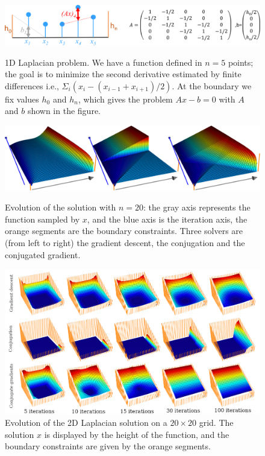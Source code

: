 \documentclass[notitlepage,oneside]{book}
\begin{document}
\begin{figure}[p]
  \centering
  \includegraphics[width=1\linewidth]{img/cg/laplace1d.png}
  \caption{1D Laplacian problem. We have a function defined in $n=5$ points; the goal is to minimize the second derivative estimated by finite differences i.e., $\Sigma_i( x_i-(x_{i-1}+x_{i+1})/2)$. 
    At the boundary we fix values $h_0$ and $h_n$, which gives the problem $Ax-b=0$ with $A$ and $b$ shown in the figure. }
  \label{fig:laplace1d}
  \vspace{5mm}

  \includegraphics[width=1\linewidth]{img/cg/laplace1dresults.png}
  \caption{
    Evolution of the solution with $n=20$: the gray axis represents the function sampled by $x$, and the blue axis is the iteration axis, the orange segments are the boundary constraints.
  Three solvers are (from left to right) the gradient descent, the conjugation and the conjugated gradient.
  }
  \label{fig:laplace1dresults}
  \vspace{5mm}

  \includegraphics[width=1\linewidth]{img/cg/laplace2d.png}
  \caption{
    Evolution of the 2D Laplacian solution on a $20\times 20$ grid.
  The solution $x$ is displayed by the height of the function, and the boundary constraints are given by the orange segments.
  }
  \label{fig:laplace2d}
\end{figure}
\end{document}
